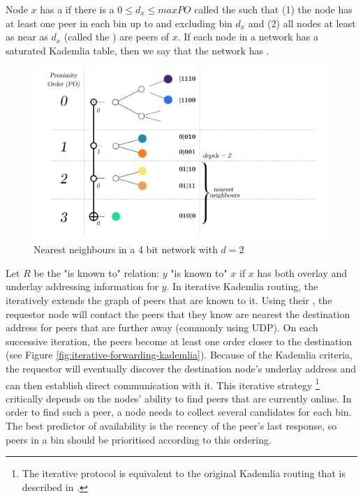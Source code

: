 Node $x$ has a  if there is a $0\leq d_x\leq \mathit{maxPO}$ called the   such that (1) the node has at least one peer in each bin up to and excluding  bin $d_x$ and (2) all nodes at least as near as $d_x$ (called the ) are peers of $x$. If each node in a network has a saturated Kademlia table, then we say that the network has .

\begin{figure}[htbp]
   \centering
    \includegraphics[width=\textwidth]{fig/kademlia-3.pdf}
   \caption[Nearest neighbours \statusgreen]{Nearest neighbours in a 4 bit network with $d = 2$ }
   \label{fig:bin-density}
\end{figure}

Let $R$ be the "is known to" relation:  $y$ "is known to" $x$ if $x$ has both overlay and underlay addressing information for $y$. 
In iterative Kademlia routing, the  iteratively extends the graph of peers that are known to it. Using their , the requestor node will contact the peers that they know are nearest the destination address for peers that are further away (commonly using UDP). On each successive iteration, the peers become at least one order closer to the destination (see Figure \ref{fig:iterative-forwarding-kademlia}). Because of the Kademlia criteria, the requestor will eventually discover the destination node's underlay address and can then establish direct communication with it. This iterative strategy%
%
\footnote{The iterative protocol is equivalent to the original Kademlia routing that is described in \citet{maymounkov2002kademlia}.
}
%
critically depends on the nodes' ability to find peers that are currently online. In order to find such a peer, a node needs to collect several candidates for each bin. The best predictor of availability is the recency of the peer's last response, so peers in a bin should be prioritised according to this ordering.

